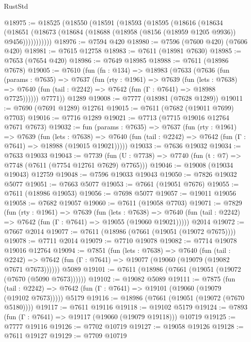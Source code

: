 \begin{lexlean}{RustStd}
\begin{coremodule}
@18975 := @18525
    (@18550
      (@18591
        (@18593
          (@18595
            (@18616
              (@18634
                (@18651
                  (@18673 (@18684 (@18688 (@18958 (@8156 (@18959 @1205 @9936)) @9456)))))))))))
@18976 := @7594 @420
@18980 := @7596 (@7600 @420) (@7606 @420)
@18981 := @7615 @12758
@18983 := @7611 (@18981 @7630)
@18985 := @7653 (@7654 @420)
@18986 := @7649 @18985
@18988 := @7611 (@18986 @7678)
@19005 := @7610
    (fun (fn : @134) =>
    @18983
      (@7633
        (@7636
          (fun (params : @7635) =>
          @7637
            (fun (rty : @1961) =>
            @7639
              (fun (lets : @7638) =>
              @7640 (fun (tail : @2242) => @7642 (fun (Γ : @7641) => @18988 @7725))))))
        @7771))
    @1289
@19008 := @7777 (@18981 (@7628 @1289))
@19011 := @7690 (@7691 @1289) @12761
@19015 := @7611 (@7682 (@19011 @7699) @7703)
@19016 := @7716 @1289
@19021 := @7713 (@7715 @19016 @12764 @7671 @7673)
@19032 := fun (params : @7635) =>
  @7637
    (fun (rty : @1961) =>
    @7639
      (fun (lets : @7638) =>
      @7640 (fun (tail : @2242) => @7642 (fun (Γ : @7641) => @18988 (@19015 @19021)))))
@19033 := @7636 @19032
@19034 := @7633 @19033
@19043 := @7739
    (fun (U : @7738) => @7740 (fun (t : @7) => @7748 (@7611 (@7754 @12761 @7629) @7765)))
@19046 := @19008 (@19034 @19043) @12759
@19048 := @7596 @19033 @19043
@19050 := @7826 @19032 @5077
@19051 := @7663 @5077
@19053 := @7661 (@19051 @7676)
@19055 := @7611 (@18986 @19053)
@19056 := @7698 @5077
@19057 := @19011 @19056
@19058 := @7682 @19057
@19060 := @7611 (@19058 @7703)
@19071 := @7829
    (fun (rty : @1961) =>
    @7639
      (fun (lets : @7638) =>
      @7640 (fun (tail : @2242) => @7642 (fun (Γ : @7641) => @19055 (@19060 @19021)))))
    @2014
@19072 := @7667 @2014
@19077 := @7611 (@18986 (@7661 (@19051 (@19072 @7675))))
@19078 := @7711 @2014
@19079 := @7710 @19078
@19082 := @7714 @19078 @19016 @12764
@19094 := @7851
    (fun (lets : @7638) =>
    @7640
      (fun (tail : @2242) =>
      @7642 (fun (Γ : @7641) => @19077 (@19060 (@19079 (@19082 @7671 @7673))))))
    @5089
@19101 := @7611 (@18986 (@7661 (@19051 (@19072 (@7670 (@5090 @7673))))))
@19102 := @19082 @5089
@19111 := @7875
    (fun (tail : @2242) => @7642 (fun (Γ : @7641) => @19101 (@19060 (@19079 (@19102 @7673)))))
    @5179
@19116 := @18986 (@7661 (@19051 (@19072 (@7670 @5180))))
@19117 := @7611 @19116
@19118 := @19102 @5179
@19124 := @7893 (fun (Γ : @7641) => @19117 (@19060 (@19079 @19118))) @10719
@19125 := @7777 @19116
@19126 := @7702 @10719
@19127 := @19058 @19126
@19128 := @7611 @19127
@19129 := @7709 @10719

\end{coremodule}
\end{lexlean}
